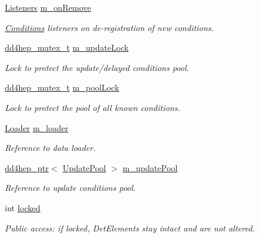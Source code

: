 \begin{DoxyCompactItemize}
\hyperlink{class_d_d4hep_1_1_conditions_1_1_conditions_manager_object_aba0162524bc90a39e30bd5f1f0067ee2}{Listeners} \hyperlink{class_d_d4hep_1_1_conditions_1_1_conditions_manager_object_aa6081a3511680ee1060e78b6a570636d}{m\+\_\+on\+Remove}
\begin{DoxyCompactList}\small\item\em \hyperlink{namespace_d_d4hep_1_1_conditions}{Conditions} listeners on de-\/registration of new conditions. \end{DoxyCompactList}\item 
\hyperlink{struct_d_d4hep_1_1dd4hep__mutex__t}{dd4hep\+\_\+mutex\+\_\+t} \hyperlink{class_d_d4hep_1_1_conditions_1_1_conditions_manager_object_a4da3e311e9b9121fef58f2cd80da12f9}{m\+\_\+update\+Lock}
\begin{DoxyCompactList}\small\item\em Lock to protect the update/delayed conditions pool. \end{DoxyCompactList}\item 
\hyperlink{struct_d_d4hep_1_1dd4hep__mutex__t}{dd4hep\+\_\+mutex\+\_\+t} \hyperlink{class_d_d4hep_1_1_conditions_1_1_conditions_manager_object_af0a0803e28ed3d30721609a420689e4a}{m\+\_\+pool\+Lock}
\begin{DoxyCompactList}\small\item\em Lock to protect the pool of all known conditions. \end{DoxyCompactList}\item 
\hyperlink{class_d_d4hep_1_1_conditions_1_1_conditions_manager_object_ab2df3fc6386b7f71ed3087271d90acc6}{Loader} \hyperlink{class_d_d4hep_1_1_conditions_1_1_conditions_manager_object_a94483d902a20171f95eaf0e2d531f05d}{m\+\_\+loader}
\begin{DoxyCompactList}\small\item\em Reference to data loader. \end{DoxyCompactList}\item 
\hyperlink{class_d_d4hep_1_1dd4hep__ptr}{dd4hep\+\_\+ptr}$<$ \hyperlink{class_d_d4hep_1_1_conditions_1_1_update_pool}{Update\+Pool} $>$ \hyperlink{class_d_d4hep_1_1_conditions_1_1_conditions_manager_object_a83ef3cf4c818d972d9c8720913c7525b}{m\+\_\+update\+Pool}
\begin{DoxyCompactList}\small\item\em Reference to update conditions pool. \end{DoxyCompactList}\item 
int \hyperlink{class_d_d4hep_1_1_conditions_1_1_conditions_manager_object_af4a66ea9d20e133cadd6e33a188d7f5b}{locked}
\begin{DoxyCompactList}\small\item\em Public access\+: if locked, Det\+Elements stay intact and are not altered. \end{DoxyCompactList}\end{DoxyCompactItemize}
